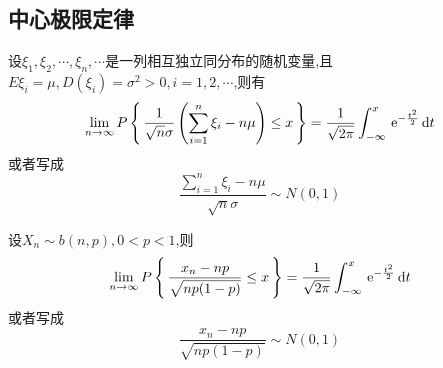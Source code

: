 \subsection{中心极限定律}
设$\xi_1,\xi_2,\cdots,\xi_n,\cdots$是一列相互独立同分布的随机变量,且$E\xi_i=\mu,D(\xi_i)=\sigma^2 >0,i=1,2,\cdots$,则有
\begin{equation}
\lim\limits_{n \to \infty }P\left\lbrace \,\frac{1}{\sqrt{n}\sigma}\left( \sum_{i=1}^{n}\xi_i-n\mu\right) \le x\,\right\rbrace =\frac{1}{\sqrt{2\pi}}\int_{-\infty }^{x}\,{\rm{e}}^{ -\frac{t^2}{2}} \,{\rm{d}} t
\end{equation}
或者写成
\begin{equation}
\frac{\displaystyle \sum_{i=1}^{n}\xi_i-n\mu}{\sqrt{n}\sigma} \sim N(0,1)
\end{equation}

设$X_n \sim b(n,p),0<p<1$,则
\begin{equation}
\lim\limits_{n \to \infty }P\left\lbrace \,\frac{x_n-np}{\sqrt{np(1-p)}}\le x\,\right\rbrace =\frac{1}{\sqrt{2\pi}}\int_{-\infty }^{x}\,{\rm{e}}^{-\frac{t^2}{2}} \,{\rm{d}} t
\end{equation}
或者写成
\begin{equation}
\frac{x_n-np}{\sqrt{np(1-p)}} \sim N(0,1)
\end{equation}








